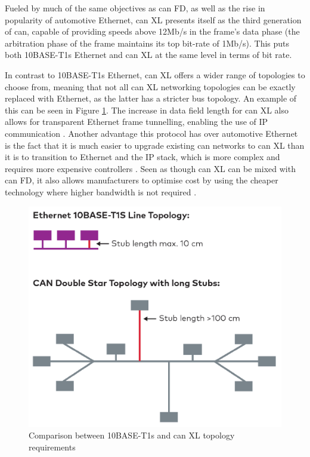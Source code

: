 Fueled by much of the same objectives as \gls{can} FD, as well as the rise in popularity of automotive Ethernet, \gls{can} XL presents itself as the third generation of \gls{can}, capable of providing speeds above 12Mb/s in the frame's data phase (the arbitration phase of the frame maintains its top bit-rate of 1Mb/s). This puts both 10BASE-T1s Ethernet and \gls{can} XL at the same level in terms of bit rate.\par
In contrast to 10BASE-T1s Ethernet, \gls{can} XL offers a wider range of topologies to choose from, meaning that not all \gls{can} XL networking topologies can be exactly replaced with Ethernet, as the latter has a stricter bus topology. An example of this can be seen in Figure \ref{fig:EthernetCANXL_Topologies}. The increase in data field length for \gls{can} XL also allows for transparent Ethernet frame tunnelling, enabling the use of IP communication \citep{BoschCANXL}. Another advantage this protocol has over automotive Ethernet is the fact that it is much easier to upgrade existing \gls{can} networks to \gls{can} XL than it is to transition to Ethernet and the IP stack, which is more complex and requires more expensive controllers \citep{VectorCANXL}. Seen as though \gls{can} XL can be mixed with \gls{can} FD, it also allows manufacturers to optimise cost by using the cheaper technology where higher bandwidth is not required \citep{BoschCANXL}.

\begin{figure}
    \centering
    \includegraphics[width = \textwidth]{img/parts/introduction/Ethernet and CAN XL Topologies.png}
    \caption{Comparison between 10BASE-T1s and \gls{can} XL topology requirements \citep{VectorCANXL}}
    \label{fig:EthernetCANXL_Topologies}
\end{figure}

